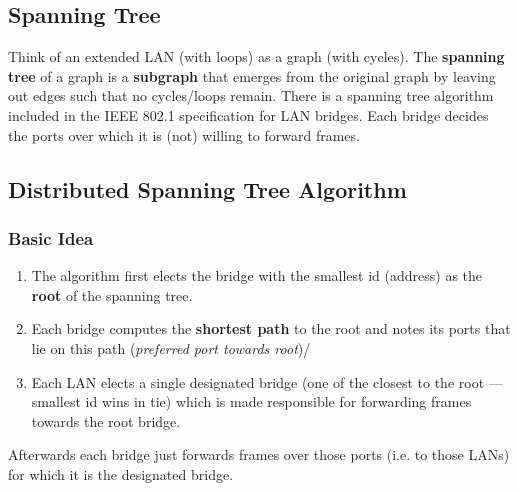 \documentclass[11pt]{article}
\begin{document}
\subsection{Spanning Tree}
\label{sec:org8489571}
Think of an extended LAN (with loops) as a graph (with cycles).
The \textbf{spanning tree} of a graph is a \textbf{subgraph} that emerges from the original graph by leaving out edges such that no cycles/loops remain.
There is a spanning tree algorithm included in the IEEE 802.1 specification for LAN bridges.
Each bridge decides the ports over which it is (not) willing to forward frames.

\subsection{Distributed Spanning Tree Algorithm}
\label{sec:org34e4572}
\subsubsection{Basic Idea}
\label{sec:org6efdf2e}
\begin{enumerate}
\item The algorithm first elects the bridge with the smallest id (address) as the \textbf{root} of the spanning tree.
\item Each bridge computes the \textbf{shortest path} to the root and notes its ports that lie on this path (\emph{preferred port towards root})/
\item Each LAN elects a single designated bridge (one of the closest to the root --- smallest id wins in tie) which is made responsible for forwarding frames towards the root bridge.
\end{enumerate}
Afterwards each bridge just forwards frames over those ports (i.e. to those LANs) for which it is the designated bridge.
\end{document}
